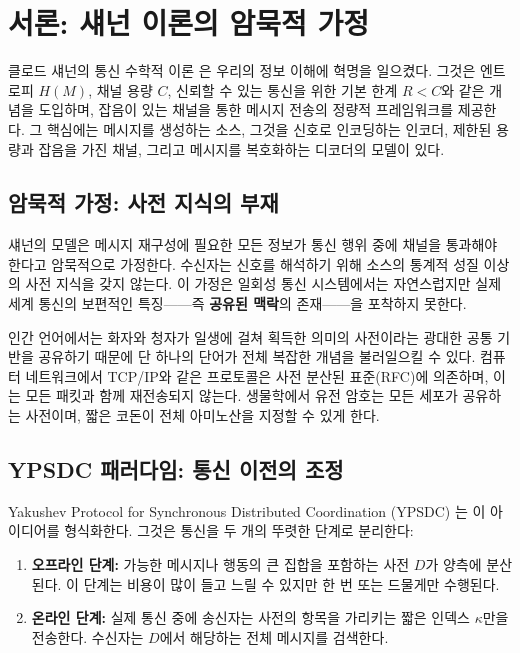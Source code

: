 \documentclass[12pt,a4paper]{article}
\begin{document}
	\section{서론: 섀넌 이론의 암묵적 가정}
	\label{sec:intro}
	
	클로드 섀넌의 통신 수학적 이론 \cite{Shannon1948}은 우리의 정보 이해에 혁명을 일으켰다. 그것은 엔트로피 $H(M)$, 채널 용량 $C$, 신뢰할 수 있는 통신을 위한 기본 한계 $R < C$와 같은 개념을 도입하며, 잡음이 있는 채널을 통한 메시지 전송의 정량적 프레임워크를 제공한다. 그 핵심에는 메시지를 생성하는 소스, 그것을 신호로 인코딩하는 인코더, 제한된 용량과 잡음을 가진 채널, 그리고 메시지를 복호화하는 디코더의 모델이 있다.
	
	\subsection{암묵적 가정: 사전 지식의 부재}
	
	섀넌의 모델은 메시지 재구성에 필요한 모든 정보가 통신 행위 중에 채널을 통과해야 한다고 암묵적으로 가정한다. 수신자는 신호를 해석하기 위해 소스의 통계적 성질 이상의 사전 지식을 갖지 않는다. 이 가정은 일회성 통신 시스템에서는 자연스럽지만 실제 세계 통신의 보편적인 특징——즉 \textbf{공유된 맥락}의 존재——을 포착하지 못한다.
	
	인간 언어에서는 화자와 청자가 일생에 걸쳐 획득한 의미의 사전이라는 광대한 공통 기반을 공유하기 때문에 단 하나의 단어가 전체 복잡한 개념을 불러일으킬 수 있다. 컴퓨터 네트워크에서 TCP/IP와 같은 프로토콜은 사전 분산된 표준(RFC)에 의존하며, 이는 모든 패킷과 함께 재전송되지 않는다. 생물학에서 유전 암호는 모든 세포가 공유하는 사전이며, 짧은 코돈이 전체 아미노산을 지정할 수 있게 한다.
	
	\subsection{YPSDC 패러다임: 통신 이전의 조정}
	
	Yakushev Protocol for Synchronous Distributed Coordination (YPSDC) \cite{Yakushev2026a, AppendixB}는 이 아이디어를 형식화한다. 그것은 통신을 두 개의 뚜렷한 단계로 분리한다:
	\begin{enumerate}
		\item \textbf{오프라인 단계:} 가능한 메시지나 행동의 큰 집합을 포함하는 사전 $D$가 양측에 분산된다. 이 단계는 비용이 많이 들고 느릴 수 있지만 한 번 또는 드물게만 수행된다.
		\item \textbf{온라인 단계:} 실제 통신 중에 송신자는 사전의 항목을 가리키는 짧은 인덱스 $\kappa$만을 전송한다. 수신자는 $D$에서 해당하는 전체 메시지를 검색한다.
	\end{enumerate}
	
\end{document}
